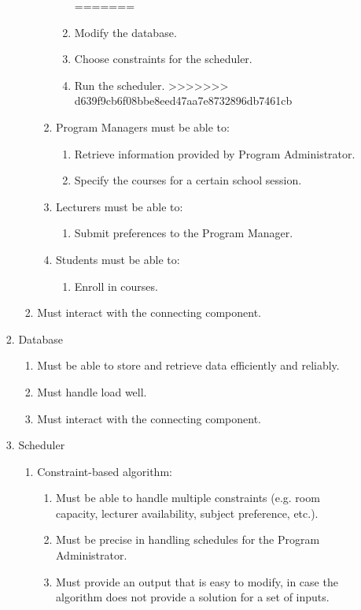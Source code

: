 \documentclass[12pt]{article}
\begin{document}
\begin{enumerate}
\begin{enumerate}
\begin{enumerate}
\begin{enumerate}
\begin{enumerate}
\begin{enumerate}
=======
		    \item Modify the database.
		    \item Choose constraints for the scheduler.
		    \item Run the scheduler.
>>>>>>> d639f9cb6f08bbe8eed47aa7e8732896db7461cb
		    \end{enumerate}
		\item Program Managers must be able to:
			\begin{enumerate}
		   \item Retrieve information provided by Program Administrator.
		   \item Specify the courses for a certain school session.
		   \end{enumerate}
		\item Lecturers must be able to:
			\begin{enumerate}
			\item Submit preferences to the Program Manager.
			\end{enumerate}
		\item Students must be able to:
			\begin{enumerate}
		   \item Enroll in courses.
		   \end{enumerate}
		\end{enumerate}
	\item Must interact with the connecting component.
	\end{enumerate}
\item Database
	\begin{enumerate}
	\item Must be able to store and retrieve data efficiently and reliably.
	\item Must handle load well.
	\item Must interact with the connecting component.
	\end{enumerate}
\item Scheduler
      \begin{enumerate}
      \item Constraint-based algorithm:
      	    \begin{enumerate}
            \item Must be able to handle multiple constraints (e.g. room capacity, lecturer availability, subject preference, etc.).
	    \item Must be precise in handling schedules for the Program Administrator.
	    \item Must provide an output that is easy to modify, in case the algorithm does not provide a solution for a set of inputs.

\end{enumerate}
\end{enumerate}
\end{enumerate}
\end{enumerate}
\end{enumerate}
\end{document}
